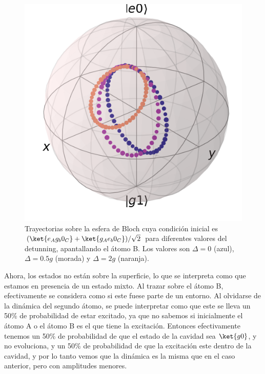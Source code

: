 \begin{figure}[H]
    \begin{minipage}[c]{0.67\textwidth}
        \includegraphics[width=\textwidth]{figuras/ch4/bloch eg0+ge0 bloch AC a=0 d=2.0 x=0.0 k=0.0 J=0.0 gamma=0.0 p=0.0.png}
    \end{minipage}\hfill
    \begin{minipage}[c]{0.3\textwidth}
        \caption{Trayectorias sobre la esfera de Bloch cuya condición inicial es $(\ket{e_Ag_b0_C}+\ket{g_Ae_b0_C})/\sqrt{2}$ para diferentes valores del detunning, apantallando el átomo B. Los valores son $\Delta=0$ (azul), $\Delta=0.5g$ (morada) y $\Delta=2g$ (naranja).}
    \end{minipage}
    \label{fig4:bloch delta eg0 sim}
\end{figure}
Ahora, los estados no están sobre la superficie, lo que se interpreta como que estamos en presencia de un estado mixto. Al trazar sobre el átomo B, efectivamente se considera como si este fuese parte de un entorno. Al olvidarse de la dinámica del segundo átomo, se puede interpretar como que este se lleva un 50\% de probabilidad de estar excitado, ya que no sabemos si inicialmente el átomo A o el átomo B es el que tiene la excitación. Entonces efectivamente tenemos un 50\% de probabilidad de que el estado de la cavidad sea $\ket{g0}$, y no evoluciona, y un 50\% de probabilidad de que la excitación este dentro de la cavidad, y por lo tanto vemos que la dinámica es la misma que en el caso anterior, pero con amplitudes menores.

